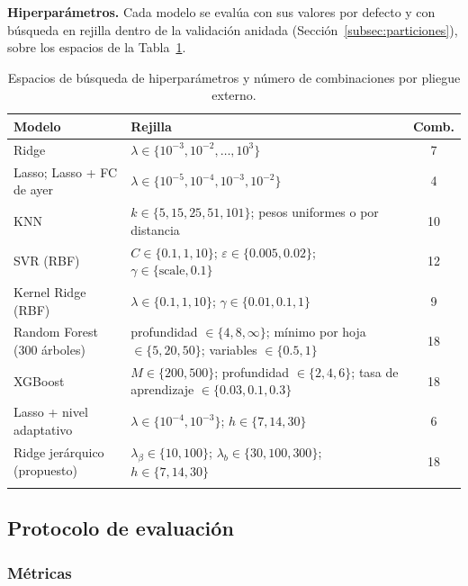 \documentclass[pdflatex,sn-mathphys-num]{sn-jnl}
\begin{document}
\textbf{Hiperparámetros.} Cada modelo se evalúa con sus valores por defecto y con búsqueda en rejilla dentro de la validación anidada (Sección~\ref{subsec:particiones}), sobre los espacios de la Tabla~\ref{tab:rejillas}.

\begin{table}[t]
\caption{Espacios de búsqueda de hiperparámetros y número de combinaciones por pliegue externo.}
\label{tab:rejillas}
\centering
\footnotesize
\begin{tabular}{@{}llc@{}}
\toprule
Modelo & Rejilla & Comb.\\
\midrule
Ridge & $\lambda \in \{10^{-3},10^{-2},\dots,10^{3}\}$ & 7\\
Lasso; Lasso + FC de ayer & $\lambda \in \{10^{-5},10^{-4},10^{-3},10^{-2}\}$ & 4\\
KNN & $k \in \{5,15,25,51,101\}$; pesos uniformes o por distancia & 10\\
SVR (RBF) & $C \in \{0.1,1,10\}$; $\varepsilon \in \{0.005,0.02\}$; $\gamma \in \{\text{scale},0.1\}$ & 12\\
Kernel Ridge (RBF) & $\lambda \in \{0.1,1,10\}$; $\gamma \in \{0.01,0.1,1\}$ & 9\\
Random Forest (300 árboles) & profundidad $\in \{4,8,\infty\}$; mínimo por hoja $\in \{5,20,50\}$; variables $\in \{0.5,1\}$ & 18\\
XGBoost & $M \in \{200,500\}$; profundidad $\in \{2,4,6\}$; tasa de aprendizaje $\in \{0.03,0.1,0.3\}$ & 18\\
Lasso + nivel adaptativo & $\lambda \in \{10^{-4},10^{-3}\}$; $h \in \{7,14,30\}$ & 6\\
Ridge jerárquico (propuesto) & $\lambda_\beta \in \{10,100\}$; $\lambda_b \in \{30,100,300\}$; $h \in \{7,14,30\}$ & 18\\
\botrule
\end{tabular}
\end{table}


\subsection{Protocolo de evaluación}\label{subsec:evaluacion}

\subsubsection{Métricas}
\end{document}
